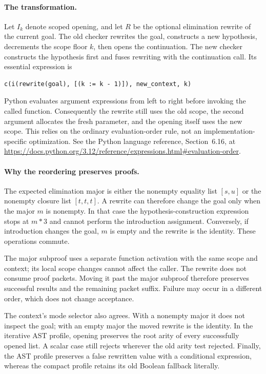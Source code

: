 \paragraph{The transformation.}
Let $I_k$ denote scoped opening, and let $R$ be the optional elimination
rewrite of the current goal. The old checker rewrites the goal, constructs
a new hypothesis, decrements the scope floor $k$, then opens the
continuation. The new checker constructs the hypothesis first and fuses
rewriting with the continuation call. Its essential expression is
\begin{verbatim}
c(i(rewrite(goal), [(k := k - 1)]), new_context, k)
\end{verbatim}
Python evaluates argument expressions from left to right before invoking
the called function. Consequently the rewrite still uses the old scope,
the second argument allocates the fresh parameter, and the opening itself
uses the new scope. This relies on the ordinary evaluation-order rule, not
an implementation-specific optimization. See the Python language reference,
Section~6.16, at
\url{https://docs.python.org/3.12/reference/expressions.html#evaluation-order}.

\paragraph{Why the reordering preserves proofs.}
The expected elimination major is either the nonempty equality list
$[s,u]$ or the nonempty closure list $[t,t,t]$. A rewrite can therefore
change the goal only when the major $m$ is nonempty. In that case the
hypothesis-construction expression stops at $m*3$ and cannot perform the
introduction assignment. Conversely, if introduction changes the goal,
$m$ is empty and the rewrite is the identity. These operations commute.

The major subproof uses a separate function activation with the same scope
and context; its local scope changes cannot affect the caller. The rewrite
does not consume proof packets. Moving it past the major subproof therefore
preserves successful results and the remaining packet suffix. Failure may
occur in a different order, which does not change acceptance.

The context's mode selector also agrees. With a nonempty major it does not
inspect the goal; with an empty major the moved rewrite is the identity.
In the iterative AST profile, opening preserves the root arity of every
successfully opened list. A scalar case still rejects wherever the old
arity test rejected. Finally, the AST profile preserves a false rewritten
value with a conditional expression, whereas the compact profile retains
its old Boolean fallback literally.

